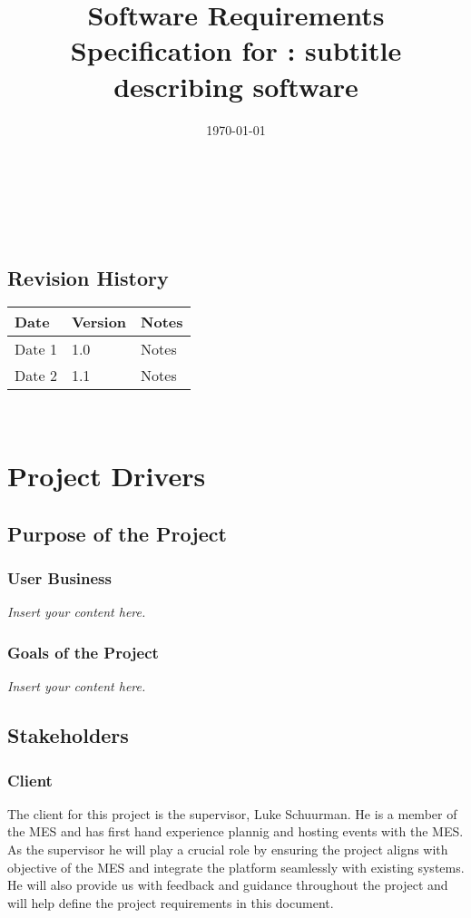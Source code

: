 \documentclass[12pt]{article}
\newcommand{\lips}{\textit{Insert your content here.}}
\begin{document}
\title{Software Requirements Specification for \progname: subtitle describing software} 
\author{\authname}
\date{\today}
	
\maketitle

~\newpage


\tableofcontents

~\newpage

\subsection*{Revision History}

\begin{tabularx}{\textwidth}{p{3cm}p{2cm}X}
\toprule {\textbf{Date}} & {\textbf{Version}} & {\textbf{Notes}}\\
\midrule
Date 1 & 1.0 & Notes\\
Date 2 & 1.1 & Notes\\
\bottomrule
\end{tabularx}

~\newpage
\section{Project Drivers}
\subsection{Purpose of the Project}
\subsubsection{User Business}
\lips
\subsubsection{Goals of the Project}
\lips
\subsection{Stakeholders}
\subsubsection{Client}
The client for this project is the supervisor, Luke Schuurman. He is a member of the MES and has first hand experience plannig and hosting events with the MES. As the supervisor he will play a crucial role by ensuring the project aligns with objective of the MES and integrate the platform seamlessly with existing systems. He will also provide us with feedback and guidance throughout the project and will help define the project requirements in this document.
\end{document}
